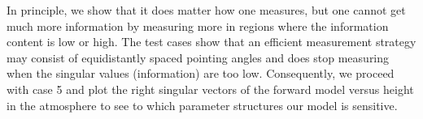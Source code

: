 
In principle, we show that it does matter how one measures, but one cannot get much more information by measuring more in regions where the information content is low or high.
The test cases show that an efficient measurement strategy may consist of equidistantly spaced pointing angles and does stop measuring when the singular values (information) are too low. 
Consequently, we proceed with case 5 and plot the right singular vectors of the forward model versus height in the atmosphere to see to which parameter structures our model is sensitive.

